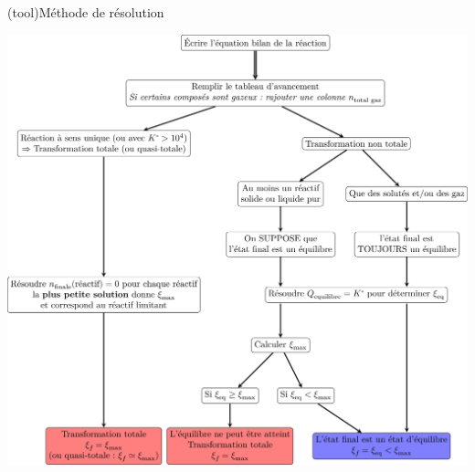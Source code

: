 \documentclass[../../main/main.tex]{subfiles}
\begin{document}
\begin{tcb*}(tool){Méthode de résolution}
	\begin{center}
		\includegraphics[width=\linewidth]{resume}
	\end{center}
\end{tcb*}
\end{document}
